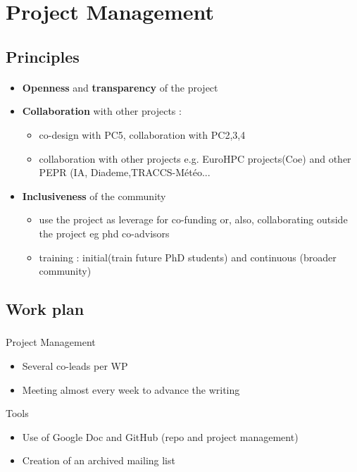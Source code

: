 \section{Project Management}

\subsection{Principles}
\begin{frame}[fragile=singleslide]{\insertsectionhead}
  \framesubtitle{\insertsubsectionhead}

  \begin{itemize}
    \item \textbf{Openness} and \textbf{transparency} of the project 
    \item \textbf{Collaboration} with other projects : 
    \begin{itemize}
      \item 
        co-design with PC5, collaboration with PC2,3,4\
        \item 
          collaboration with other projects e.g. EuroHPC projects(Coe) and other PEPR (IA, Diademe,TRACCS-Météo...
    \end{itemize}
    \item \textbf{Inclusiveness} of the community 
    \begin{itemize}
      \item use the project as leverage for co-funding  or, also, collaborating outside the project eg phd co-advisors
      \item training : initial(train future PhD students) and continuous (broader community)
    \end{itemize}      
  \end{itemize}

\end{frame}

\subsection{Work plan}
\begin{frame}
  \frametitle{\insertsectionhead}
  \framesubtitle{\insertsubsectionhead}
  \begin{alertblock}{Project Management}
    \begin{itemize}
      \item Several co-leads per WP 
      \item Meeting almost every week to advance the writing

    \end{itemize}
  \end{alertblock}

\begin{alertblock}{Tools}
  \begin{itemize}
    \item  Use of Google Doc and GitHub (repo and project management)
    \item Creation  of an archived mailing list 
  \end{itemize}
\end{alertblock}
\end{frame}

